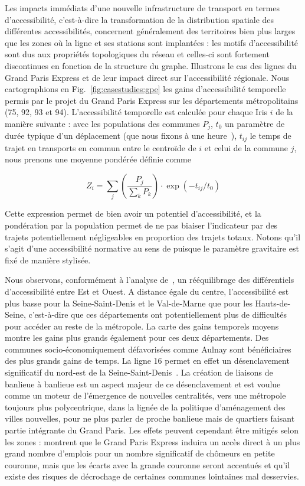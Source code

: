 Les impacts immédiats d'une nouvelle infrastructure de transport en termes d'accessibilité, c'est-à-dire la transformation de la distribution spatiale des différentes accessibilités, concernent généralement des territoires bien plus larges que les zones où la ligne et ses stations sont implantées : les motifs d'accessibilité sont dus aux propriétés topologiques du réseau et celles-ci sont fortement discontinues en fonction de la structure du graphe. Illustrons le cas des lignes du Grand Paris Express et de leur impact direct sur l'accessibilité régionale. Nous cartographions en Fig.~\ref{fig:casestudies:gpe} les gains d'accessibilité temporelle permis par le projet du Grand Paris Express sur les départements métropolitains (75, 92, 93 et 94). L'accessibilité temporelle est calculée pour chaque Iris $i$ de la manière suivante : avec les populations des communes $P_j$, $t_0$ un paramètre de durée typique d'un déplacement (que nous fixons à une heure~\cite{zahavi1980regularities}), $t_{ij}$ le temps de trajet en transports en commun entre le centroïde de $i$ et celui de la commune $j$, nous prenons une moyenne pondérée définie comme

\[
Z_i = \sum_j \left(\frac{P_j}{\sum_k P_k}\right)\cdot \exp\left(- t_{ij}/t_0\right)
\]

Cette expression permet de bien avoir un potentiel d'accessibilité, et la pondération par la population permet de ne pas biaiser l'indicateur par des trajets potentiellement négligeables en proportion des trajets totaux. Notons qu'il s'agit d'une accessibilité normative au sens de \cite{paez2012measuring} puisque le paramètre gravitaire est fixé de manière stylisée.


Nous observons, conformément à l'analyse de~\cite{beaucire2013grand}, un rééquilibrage des différentiels d'accessibilité entre Est et Ouest. A distance égale du centre, l'accessibilité est plus basse pour la Seine-Saint-Denis et le Val-de-Marne que pour les Hauts-de-Seine, c'est-à-dire que ces départements ont potentiellement plus de difficultés pour accéder au reste de la métropole. La carte des gains temporels moyens montre les gains plus grands également pour ces deux départements. Des communes socio-économiquement défavorisées comme Aulnay sont bénéficiaires des plus grands gains de temps. La ligne 16 permet en effet un désenclavement significatif du nord-est de la Seine-Saint-Denis~\cite{desjardins2016grand}. La création de liaisons de banlieue à banlieue est un aspect majeur de ce désenclavement et est voulue comme un moteur de l'émergence de nouvelles centralités, vers une métropole toujours plus polycentrique, dans la lignée de la politique d'aménagement des villes nouvelles, pour ne plus parler de proche banlieue mais de quartiers faisant partie intégrante du Grand Paris. Les effets peuvent cependant être mitigés selon les zones : \cite{l2013grand} montrent que le Grand Paris Express induira un accès direct à un plus grand nombre d'emplois pour un nombre significatif de chômeurs en petite couronne, mais que les écarts avec la grande couronne seront accentués et qu'il existe des risques de décrochage de certaines communes lointaines mal desservies. 


